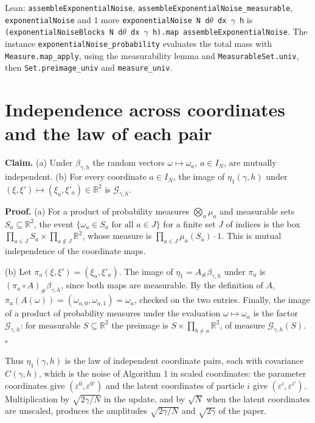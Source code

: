 \documentclass[11pt,a4paper]{article}
\begin{document}
\begin{leanbox}{Lean: \texttt{assembleExponentialNoise}, \texttt{assembleExponentialNoise\_\allowbreak{}measurable}, \texttt{exponentialNoise} and 1 more}
\texttt{exponential\allowbreak{}Noise N d\ensuremath{\theta} dx \ensuremath{\gamma} h} is \texttt{(exponential\allowbreak{}Noise\allowbreak{}Blocks N d\ensuremath{\theta} dx \ensuremath{\gamma} h).\allowbreak{}map assemble\allowbreak{}Exponential\allowbreak{}Noise}. The instance \texttt{exponential\allowbreak{}Noise\_\allowbreak{}probability} evaluates the total mass with \texttt{Measure.\allowbreak{}map\_\allowbreak{}apply}, using the measurability lemma and \texttt{Measurable\allowbreak{}Set.\allowbreak{}univ}, then \texttt{Set.\allowbreak{}preimage\_\allowbreak{}univ} and \texttt{measure\_\allowbreak{}univ}.
\end{leanbox}

\section{\texorpdfstring{Independence across coordinates and the law of each pair}{Independence across coordinates and the law of each pair}}


\textbf{Claim.} (a) Under \(\beta_{\gamma,h}\) the random vectors \(\omega\mapsto\omega_a\), \(a\in I_N\), are mutually independent. (b) For every coordinate \(a\in I_N\), the image of \(\eta_1(\gamma,h)\) under \((\xi,\xi')\mapsto(\xi_a,\xi'_a)\in\mathbb R^2\) is \(\mathcal G_{\gamma,h}\).




\textbf{Proof.} (a) For a product of probability measures \(\bigotimes_a\mu_a\) and measurable sets \(S_a\subseteq\mathbb R^2\), the event \(\{\omega_a\in S_a\text{ for all }a\in J\}\) for a finite set \(J\) of indices is the box \(\prod_{a\in J}S_a\times\prod_{a\notin J}\mathbb R^2\), whose measure is \(\prod_{a\in J}\mu_a(S_a)\cdot1\). This is mutual independence of the coordinate maps.




(b) Let \(\pi_a(\xi,\xi')=(\xi_a,\xi'_a)\). The image of \(\eta_1=A_\#\beta_{\gamma,h}\) under \(\pi_a\) is \((\pi_a\circ A)_\#\beta_{\gamma,h}\), since both maps are measurable. By the definition of \(A\), \(\pi_a(A(\omega))=(\omega_{a,0},\omega_{a,1})=\omega_a\), checked on the two entries. Finally, the image of a product of probability measures under the evaluation \(\omega\mapsto\omega_a\) is the factor \(\mathcal G_{\gamma,h}\): for measurable \(S\subseteq\mathbb R^2\) the preimage is \(S\times\prod_{b\ne a}\mathbb R^2\), of measure \(\mathcal G_{\gamma,h}(S)\). \(\square\)




Thus \(\eta_1(\gamma,h)\) is the law of independent coordinate pairs, each with covariance \(C(\gamma,h)\), which is the noise of Algorithm 1 in scaled coordinates: the parameter coordinates give \((\varepsilon^0,\varepsilon^{0\prime})\) and the latent coordinates of particle \(i\) give \((\varepsilon^i,\varepsilon^{i\prime})\). Multiplication by \(\sqrt{2\gamma/N}\) in the update, and by \(\sqrt N\) when the latent coordinates are unscaled, produces the amplitudes \(\sqrt{2\gamma/N}\) and \(\sqrt{2\gamma}\) of the paper.
\end{document}
